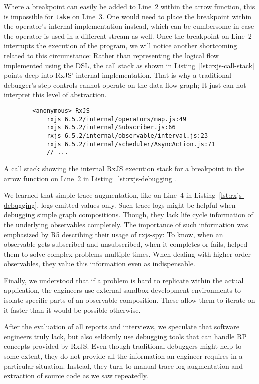 \documentclass[sigplan,screen,review]{acmart}
\begin{document}
Where a breakpoint can easily be added to Line~2 within the arrow function, this is impossible for \texttt{take} on Line~3. One would need to place the breakpoint within the operator's internal implementation instead, which can be cumbersome in case the operator is used in a different stream as well. Once the breakpoint on Line~2 interrupts the execution of the program, we will notice another shortcoming related to this circumstance: Rather than representing the logical flow implemented using the DSL, the call stack as shown in Listing~\ref{lst:rxjs-call-stack} points deep into RxJS' internal implementation. That is why a traditional debugger's step controls cannot operate on the data-flow graph; It just can not interpret this level of abstraction.

\begin{listing}
	\begin{verbatim}
		<anonymous> RxJS
			rxjs 6.5.2/internal/operators/map.js:49
			rxjs 6.5.2/internal/Subscriber.js:66
			rxjs 6.5.2/internal/observable/interval.js:23
			rxjs 6.5.2/internal/scheduler/AsyncAction.js:71
			// ...
	\end{verbatim}
	\caption{A call stack showing the internal RxJS execution stack for a breakpoint in the arrow function on Line~2 in Listing~\ref{lst:rxjs-debugging}.}
	\label{lst:rxjs-call-stack}
\end{listing}

We learned that simple trace augmentation, like on Line~4 in Listing~\ref{lst:rxjs-debugging}, logs emitted values only. Such trace logs might be helpful when debugging simple graph compositions. Though, they lack life cycle information of the underlying observables completely. The importance of such information was emphasized by R5 describing their usage of rxjs-spy: To know, when an observable gets subscribed and unsubscribed, when it completes or fails, helped them to solve complex problems multiple times. When dealing with higher-order observables, they value this information even as indispensable.

Finally, we understood that if a problem is hard to replicate within the actual application, the engineers use external sandbox development environments to isolate specific parts of an observable composition. These allow them to iterate on it faster than it would be possible otherwise.

After the evaluation of all reports and interviews, we speculate that software engineers truly lack, but also seldomly use debugging tools that can handle RP concepts provided by RxJS. Even though traditional debuggers might help to some extent, they do not provide all the information an engineer requires in a particular situation. Instead, they turn to manual trace log augmentation and extraction of source code as we saw repeatedly.
\end{document}
